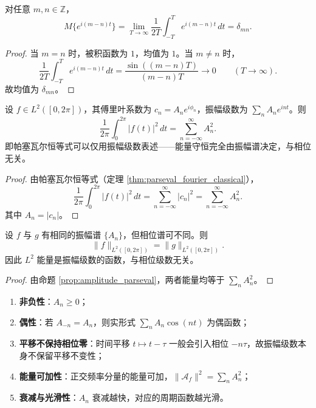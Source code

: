 \begin{lemma}[指数基的玻尔均值正交性]\label{lem:amplitude_exponential_mean}
对任意 $m,n \in \mathbb{Z}$，
\[
M\{e^{i(m-n)t}\}
= \lim_{T\to\infty}\frac{1}{2T}\int_{-T}^{T} e^{i(m-n)t}\,dt
= \delta_{mn}.
\]
\end{lemma}

\begin{proof}
当 $m=n$ 时，被积函数为 $1$，均值为 $1$。当 $m\neq n$ 时，
\[
\frac{1}{2T}\int_{-T}^{T} e^{i(m-n)t}\,dt
= \frac{\sin((m-n)T)}{(m-n)T} \to 0 \qquad (T\to\infty).
\]
故均值为 $\delta_{mn}$。
\end{proof}

\begin{proposition}[振幅级数的帕塞瓦尔恒等式]\label{prop:amplitude_parseval}
设 $f \in L^2([0,2\pi])$，其傅里叶系数为 $c_n=A_n e^{i\phi_n}$，振幅级数为 $\sum_n A_n e^{int}$。则
\[
\frac{1}{2\pi}\int_0^{2\pi} |f(t)|^2\,dt
= \sum_{n=-\infty}^{\infty} A_n^2.
\]
即帕塞瓦尔恒等式可以仅用振幅级数表述——能量守恒完全由振幅谱决定，与相位无关。
\end{proposition}

\begin{proof}
由帕塞瓦尔恒等式（定理 \ref{thm:parseval_fourier_classical}），
\[
\frac{1}{2\pi}\int_0^{2\pi} |f(t)|^2\,dt
= \sum_{n=-\infty}^{\infty} |c_n|^2
= \sum_{n=-\infty}^{\infty} A_n^2.
\]
其中 $A_n=|c_n|$。
\end{proof}

\begin{corollary}[能量仅由振幅决定]\label{cor:amplitude_energy_only}
设 $f$ 与 $g$ 有相同的振幅谱 $\{A_n\}$，但相位谱可不同。则
\[
\|f\|_{L^2([0,2\pi])} = \|g\|_{L^2([0,2\pi])}.
\]
因此 $L^2$ 能量是振幅级数的函数，与相位级数无关。
\end{corollary}

\begin{proof}
由命题 \ref{prop:amplitude_parseval}，两者能量均等于 $\sum_n A_n^2$。
\end{proof}

\begin{property}[振幅级数的基本性质]\label{prop:amplitude_series_properties}
\begin{enumerate}[label=(\roman*)]
    \item \textbf{非负性}：$A_n\ge 0$；
    \item \textbf{偶性}：若 $A_{-n}=A_n$，则实形式 $\sum_n A_n\cos(nt)$ 为偶函数；
    \item \textbf{平移不保持相位零}：时间平移 $t\mapsto t-\tau$ 一般会引入相位 $-n\tau$，故振幅级数本身不保留平移不变性；
    \item \textbf{能量可加性}：正交频率分量的能量可加，$\|\mathcal{A}_f\|^2=\sum_n A_n^2$；
    \item \textbf{衰减与光滑性}：$A_n$ 衰减越快，对应的周期函数越光滑。
\end{enumerate}
\end{property}

